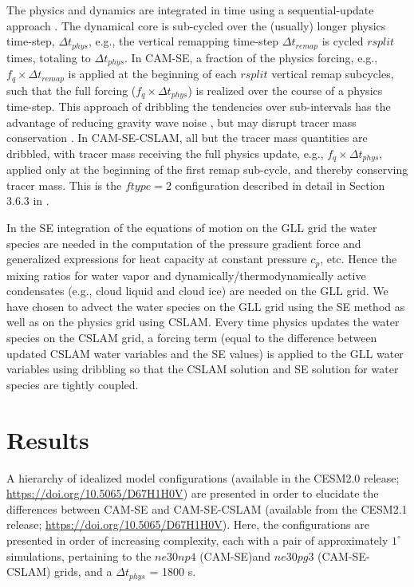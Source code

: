 \documentclass[twocol]{ametsoc}
\begin{document}
{\color{red}The physics and dynamics are integrated in time using a sequential-update approach \citep[e.g.,][]{W2002MWR}. The dynamical core is sub-cycled over the (usually) longer physics time-step, $\Delta t_{phys}$, e.g., the vertical remapping time-step $\Delta t_{remap}$ is cycled $rsplit$ times, totaling to $\Delta t_{phys}$. In CAM-SE, a fraction of the physics forcing, e.g., $f_q \times \Delta t_{remap}$ is applied at the beginning of each $rsplit$ vertical remap subcycles, such that the full forcing ($f_q \times \Delta t_{phys}$) is realized over the course of a physics time-step. This approach of dribbling the tendencies over sub-intervals has the advantage of reducing gravity wave noise \citep{TJ2016GMD}, but may disrupt tracer mass conservation \citep{water-leak}. In CAM-SE-CSLAM, all but the tracer mass quantities are dribbled, with tracer mass receiving the full physics update, e.g., $f_q \times \Delta t_{phys}$, applied only at the beginning of the first remap sub-cycle, and thereby conserving tracer mass. This is the $ftype=2$ configuration described in detail in Section 3.6.3 in \cite{LetAl2018JAMES}.

In the SE integration of the equations of motion on the GLL grid the water species are needed in the computation of the pressure gradient force and generalized expressions for heat capacity at constant pressure $c_p$, etc. Hence the mixing ratios for water vapor and dynamically/thermodynamically active condensates (e.g., cloud liquid and cloud ice) are needed on the GLL grid. We have chosen to advect the water species on the GLL grid using the SE method as well as on the physics grid using CSLAM. Every time physics updates the water species on the CSLAM grid, a forcing term (equal to the difference between updated CSLAM water variables and the SE values) is applied to the GLL water variables using dribbling so that the CSLAM solution and SE solution for water species are tightly coupled. 
}

\section{Results}\label{sec:results}

{\color{red}A hierarchy of idealized model configurations (available in the CESM2.0 release; \url{https://doi.org/10.5065/D67H1H0V}) are presented in order to elucidate the differences between CAM-SE and CAM-SE-CSLAM (available from the CESM2.1 release; \url{https://doi.org/10.5065/D67H1H0V}). Here, the configurations are presented in order of increasing complexity, each with a pair of approximately $1^{\circ}$ simulations, pertaining to the $ne30np4$ (CAM-SE)and $ne30pg3$ (CAM-SE-CSLAM) grids, and a $\Delta t_{phys}$ = 1800 s.{}}
\end{document}
